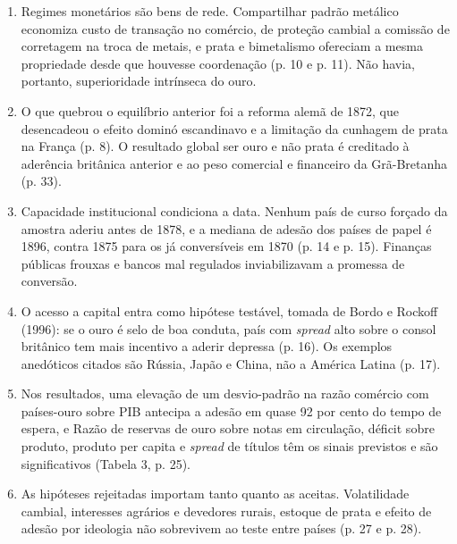 \begin{enumerate}[leftmargin=*,nosep]
\item Regimes monetários são bens de rede. Compartilhar padrão metálico
economiza custo de transação no comércio, de proteção cambial a comissão de
corretagem na troca de metais, e prata e bimetalismo ofereciam a mesma
propriedade desde que houvesse coordenação (p. 10 e p. 11). Não havia, portanto,
superioridade intrínseca do ouro.
\item O que quebrou o equilíbrio anterior foi a reforma alemã de 1872, que
desencadeou o efeito dominó escandinavo e a limitação da cunhagem de prata na
França (p. 8). O resultado global ser ouro e não prata é creditado à aderência
britânica anterior e ao peso comercial e financeiro da Grã-Bretanha (p. 33).
\item Capacidade institucional condiciona a data. Nenhum país de curso forçado
da amostra aderiu antes de 1878, e a mediana de adesão dos países de papel é
1896, contra 1875 para os já conversíveis em 1870 (p. 14 e p. 15). Finanças
públicas frouxas e bancos mal regulados inviabilizavam a promessa de conversão.
\item O acesso a capital entra como hipótese testável, tomada de Bordo e
Rockoff (1996): se o ouro é selo de boa conduta, país com \emph{spread} alto
sobre o consol britânico tem mais incentivo a aderir depressa (p. 16). Os
exemplos anedóticos citados são Rússia, Japão e China, não a América Latina
(p. 17).
\item Nos resultados, uma elevação de um desvio-padrão na razão comércio com
países-ouro sobre PIB antecipa a adesão em quase 92 por cento do tempo de
espera, e
Razão de reservas de ouro sobre notas em circulação, déficit sobre produto,
produto per capita e \emph{spread} de títulos têm os sinais previstos e são
significativos (Tabela 3, p. 25).
\item As hipóteses rejeitadas importam tanto quanto as aceitas. Volatilidade
cambial, interesses agrários e devedores rurais, estoque de prata e efeito de
adesão por ideologia não sobrevivem ao teste entre países (p. 27 e p. 28).
\end{enumerate}

